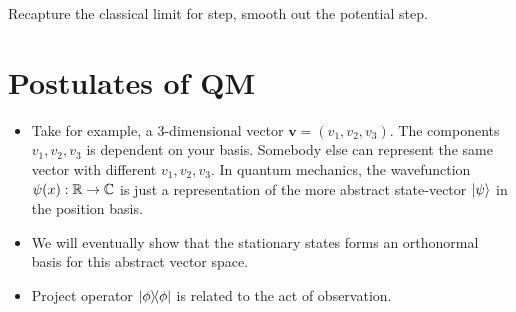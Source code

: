 \documentclass[12pt]{article}
\begin{document}
Recapture the classical limit for step, smooth out the potential step.

\section{Postulates of QM}
\begin{itemize}
    \item Take for example, a $3$-dimensional vector $\mathbf v=(v_1,v_2,v_3).$ The components $v_1,v_2,v_3$ is dependent on your basis. Somebody else can represent the same vector with different $v_1,v_2,v_3.$ In quantum mechanics, the wavefunction $\psi(x):\mathbb{R}\to\mathbb{C}$ is just a representation of the more abstract state-vector $\ket\psi$ in the position basis.
    \item We will eventually show that the stationary states forms an orthonormal basis for this abstract vector space.
    \item Project operator $\ketbra{\phi}{\phi}$ is related to the act of observation.
\end{itemize}
\end{document}
